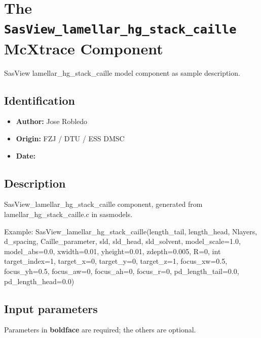 \section{The \texttt{SasView\_lamellar\_hg\_stack\_caille} McXtrace Component}
SasView lamellar\_hg\_stack\_caille model component as sample description.

\subsection*{Identification}
\begin{itemize}
  \item \textbf{Author:} Jose Robledo
  \item \textbf{Origin:} FZJ / DTU / ESS DMSC
  \item \textbf{Date:} 
\end{itemize}

\subsection*{Description}
SasView\_lamellar\_hg\_stack\_caille component, generated from lamellar\_hg\_stack\_caille.c in sasmodels.

Example: SasView\_lamellar\_hg\_stack\_caille(length\_tail, length\_head, Nlayers, d\_spacing, Caille\_parameter, sld, sld\_head, sld\_solvent, model\_scale=1.0, model\_abs=0.0, xwidth=0.01, yheight=0.01, zdepth=0.005, R=0, int target\_index=1, target\_x=0, target\_y=0, target\_z=1, focus\_xw=0.5, focus\_yh=0.5, focus\_aw=0, focus\_ah=0, focus\_r=0, pd\_length\_tail=0.0, pd\_length\_head=0.0)

\subsection*{Input parameters}
Parameters in \textbf{boldface} are required; the others are optional.

